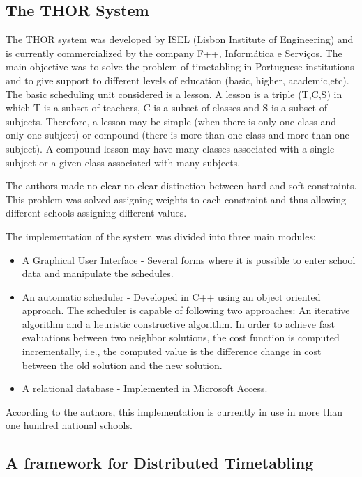 \subsection{The THOR System}

The THOR system \citep{thor} was developed by ISEL (Lisbon Institute of Engineering) and is currently commercialized by the company F++, Informática e Serviços. The main objective was to solve the problem of timetabling in Portuguese institutions and to give support to different levels of education (basic, higher, academic,etc). \\
The basic scheduling unit considered is a lesson. A lesson is a triple (T,C,S) in which T is a subset of teachers, C is a subset of classes and S is a subset of subjects. Therefore, a lesson may be simple (when there is only one class and only one subject) or compound (there is more than one class and more than one subject). A compound lesson may have many classes associated with a single subject or a given class associated with many subjects.

The authors made no clear no clear distinction between hard and soft constraints. This problem was solved assigning weights to each constraint and thus allowing different schools assigning different values.


The implementation of the system was divided into three main modules:
\begin{itemize}
	\item A Graphical User Interface - Several forms where it is possible to enter school data and manipulate the schedules.
	\item An automatic scheduler - Developed in C++ using an object oriented approach. The scheduler is capable of following two approaches: An iterative algorithm and a heuristic constructive algorithm. In order to achieve fast evaluations between two neighbor solutions, the cost function is computed incrementally, i.e., the computed value is the difference change in cost between the old solution and the new solution. 
	\item A relational database - Implemented in Microsoft Access.
\end{itemize}

According to the authors, this implementation is currently in use in more than one hundred national schools.

\subsection{A framework for Distributed Timetabling}

